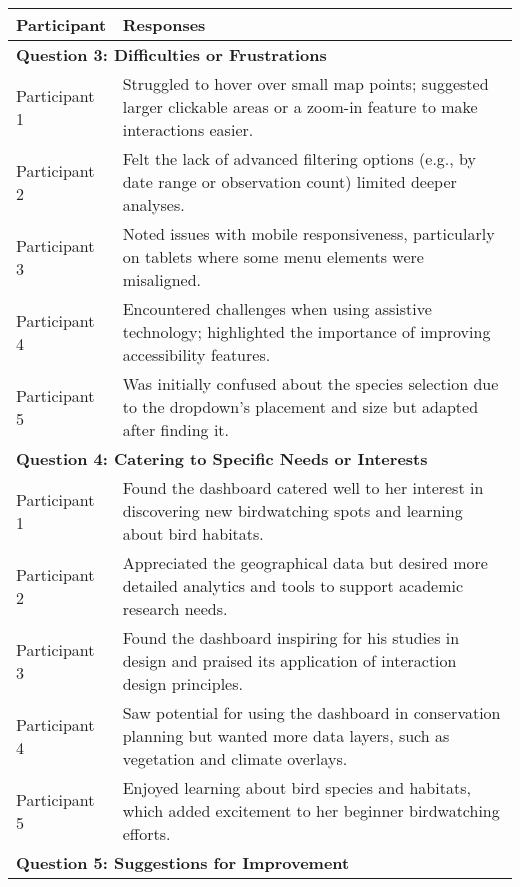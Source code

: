 \begin{table}[H]
    \centering
    \begin{tabular}{p{3cm} | p{12cm}}
        \hline
        \textbf{Participant} & \textbf{Responses} \\
        \hline
        \multicolumn{2}{l}{\textbf{Question 3: Difficulties or Frustrations}} \\
        \hline
        Participant 1 & Struggled to hover over small map points; suggested larger clickable areas or a zoom-in feature to make interactions easier. \\
        \hline
        Participant 2 & Felt the lack of advanced filtering options (e.g., by date range or observation count) limited deeper analyses. \\
        \hline
        Participant 3 & Noted issues with mobile responsiveness, particularly on tablets where some menu elements were misaligned. \\
        \hline
        Participant 4 & Encountered challenges when using assistive technology; highlighted the importance of improving accessibility features. \\
        \hline
        Participant 5 & Was initially confused about the species selection due to the dropdown’s placement and size but adapted after finding it. \\
        \hline
        \multicolumn{2}{l}{\textbf{Question 4: Catering to Specific Needs or Interests}} \\
        \hline
        Participant 1 & Found the dashboard catered well to her interest in discovering new birdwatching spots and learning about bird habitats. \\
        \hline
        Participant 2 & Appreciated the geographical data but desired more detailed analytics and tools to support academic research needs. \\
        \hline
        Participant 3 & Found the dashboard inspiring for his studies in design and praised its application of interaction design principles. \\
        \hline
        Participant 4 & Saw potential for using the dashboard in conservation planning but wanted more data layers, such as vegetation and climate overlays. \\
        \hline
        Participant 5 & Enjoyed learning about bird species and habitats, which added excitement to her beginner birdwatching efforts. \\
        \hline
        \multicolumn{2}{l}{\textbf{Question 5: Suggestions for Improvement}} \\

\end{tabular}
\end{table}
